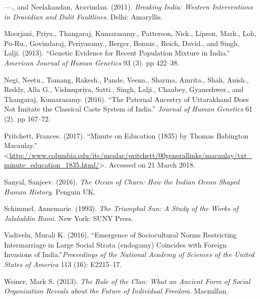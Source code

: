 \begin{thebibliography}{99}
  ---., and Neelakandan, Aravindan. (2011). \textit{Breaking India: Western Interventions in Dravidian and Dalit Faultlines}. Delhi: Amaryllis.

  Moorjani, Priya., Thangaraj, Kumarasamy., Patterson, Nick., Lipson, Mark., Loh, Po-Ru., Govindaraj, Periyasamy., Berger, Bonnie., Reich, David., and Singh, Lalji. (2013). “Genetic Evidence for Recent Population Mixture in India.” \textit{American Journal of Human Genetics} 93 (3). pp 422–38.

  Negi, Neetu., Tamang, Rakesh., Pande, Veena., Sharma, Amrita., Shah, Anish., Reddy, Alla G., Vishnupriya, Satti., Singh, Lalji., Chaubey, Gyaneshwer., and Thangaraj, Kumarasamy. (2016). “The Paternal Ancestry of Uttarakhand Does Not Imitate the Classical Caste System of India.” \textit{Journal of Human Genetics} 61 (2). pp 167–72.

  Pritchett, Frances. (2017). “Minute on Education (1835) by Thomas Babington Macaulay.” \textless \url{http://www.columbia.edu/itc/mealac/pritchett/00generallinks/macaulay/txt_minute_education_1835.html/}\textgreater. Accessed on 21 March 2018.

  Sanyal, Sanjeev. (2016). \textit{The Ocean of Churn: How the Indian Ocean Shaped Human History}. Penguin UK.

  Schimmel, Annemarie. (1993). \textit{The Triumphal Sun: A Study of the Works of Jalaloddin Rumi}. New York: SUNY Press.

  Vadivelu, Murali K. (2016). “Emergence of Sociocultural Norms Restricting Intermarriage in Large Social Strata (endogamy) Coincides with Foreign Invasions of India.”\textit{Proceedings of the National Academy of Sciences of the United States of America} 113 (16): E2215–17.

  Weiner, Mark S. (2013). \textit{The Rule of the Clan: What an Ancient Form of Social Organization Reveals about the Future of Individual Freedom}. Macmillan.

 \end{thebibliography}

\theendnotes

\label{chapter10-end}
